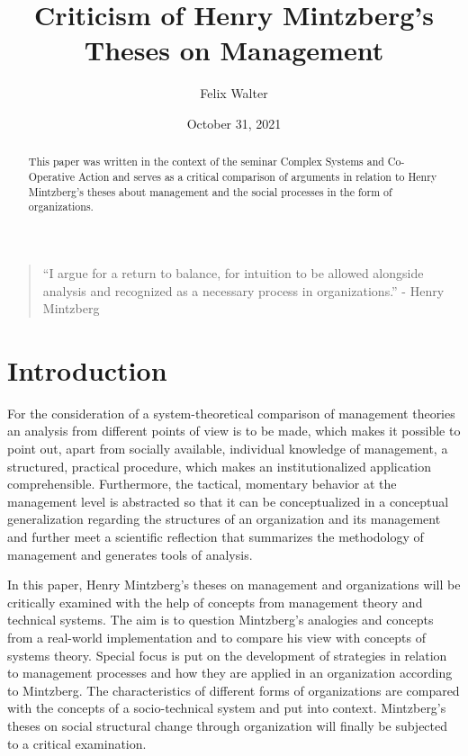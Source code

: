 \documentclass[a4paper,12pt]{article}
\title{Criticism of Henry Mintzberg's Theses on Management}
\author{Felix Walter}
\date{October 31, 2021}
\begin{document}
 
\maketitle 

\begin{abstract}
This paper was written in the context of the seminar Complex Systems and
Co-Operative Action and serves as a critical comparison of arguments in
relation to Henry Mintzberg's theses about management and the social processes
in the form of organizations.
\end{abstract}
\begin{quote}
  “I argue for a return to balance, for intuition to be allowed alongside
  analysis and recognized as a necessary process in organizations.” - Henry
  Mintzberg \cite{Mintzberg}
\end{quote}
\thispagestyle{empty}
\newpage
\tableofcontents
\newpage

\section{Introduction}

For the consideration of a system-theoretical comparison of management
theories an analysis from different points of view is to be made, which makes
it possible to point out, apart from socially available, individual knowledge
of management, a structured, practical procedure, which makes an
institutionalized application comprehensible. Furthermore, the tactical,
momentary behavior at the management level is abstracted so that it can be
conceptualized in a conceptual generalization regarding the structures of an
organization and its management and further meet a scientific reflection that
summarizes the methodology of management and generates tools of analysis.

In this paper, Henry Mintzberg's theses on management and organizations will
be critically examined with the help of concepts from management theory and
technical systems. The aim is to question Mintzberg's analogies and concepts
from a real-world implementation and to compare his view with concepts of
systems theory. Special focus is put on the development of strategies in
relation to management processes and how they are applied in an organization
according to Mintzberg. The characteristics of different forms of
organizations are compared with the concepts of a socio-technical system and
put into context. Mintzberg's theses on social structural change through
organization will finally be subjected to a critical examination.
\end{document}
